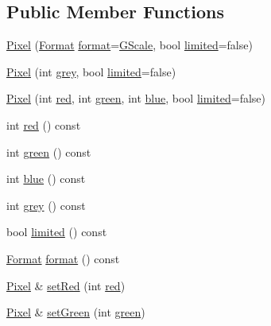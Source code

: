 \subsection*{Public Member Functions}
\begin{DoxyCompactItemize}
\item 
\mbox{\hyperlink{class_pixel_ac82279ce9ebca9dde69f1b0c50adab42}{Pixel}} (\mbox{\hyperlink{class_pixel_aa1531d5d16ab3ab809a8e071145f0a50}{Format}} \mbox{\hyperlink{class_pixel_a83b0f5dce7b7c07c9e482658426eea5f}{format}}=\mbox{\hyperlink{class_pixel_aa1531d5d16ab3ab809a8e071145f0a50a0067e32761943fc277951f656686ce1a}{G\+Scale}}, bool \mbox{\hyperlink{class_pixel_a95cb63613222cda3c462a350540bcbc0}{limited}}=false)
\item 
\mbox{\hyperlink{class_pixel_a3657c5d595b9eb8d2aab7d5cd4f0c200}{Pixel}} (int \mbox{\hyperlink{class_pixel_ae9b03b6a253f0ba344a7bfaa8d4a17f6}{grey}}, bool \mbox{\hyperlink{class_pixel_a95cb63613222cda3c462a350540bcbc0}{limited}}=false)
\item 
\mbox{\hyperlink{class_pixel_ae3cc04f5e89adc67faf1af864338e537}{Pixel}} (int \mbox{\hyperlink{class_pixel_a29d67107325086ef34118afb5dcf440a}{red}}, int \mbox{\hyperlink{class_pixel_a7febfbcec6e4ed1a31e86a78fc493fcf}{green}}, int \mbox{\hyperlink{class_pixel_a2df4c0422c0bfe60e03bbc3496ea6618}{blue}}, bool \mbox{\hyperlink{class_pixel_a95cb63613222cda3c462a350540bcbc0}{limited}}=false)
\item 
int \mbox{\hyperlink{class_pixel_a29d67107325086ef34118afb5dcf440a}{red}} () const
\item 
int \mbox{\hyperlink{class_pixel_a7febfbcec6e4ed1a31e86a78fc493fcf}{green}} () const
\item 
int \mbox{\hyperlink{class_pixel_a2df4c0422c0bfe60e03bbc3496ea6618}{blue}} () const
\item 
int \mbox{\hyperlink{class_pixel_ae9b03b6a253f0ba344a7bfaa8d4a17f6}{grey}} () const
\item 
bool \mbox{\hyperlink{class_pixel_a95cb63613222cda3c462a350540bcbc0}{limited}} () const
\item 
\mbox{\hyperlink{class_pixel_aa1531d5d16ab3ab809a8e071145f0a50}{Format}} \mbox{\hyperlink{class_pixel_a83b0f5dce7b7c07c9e482658426eea5f}{format}} () const
\item 
\mbox{\hyperlink{class_pixel}{Pixel}} \& \mbox{\hyperlink{class_pixel_ae0c6a2b07578ee6b54512629b1822195}{set\+Red}} (int \mbox{\hyperlink{class_pixel_a29d67107325086ef34118afb5dcf440a}{red}})
\item 
\mbox{\hyperlink{class_pixel}{Pixel}} \& \mbox{\hyperlink{class_pixel_a7779ebd5228cd4cde61ebca23b0b4e53}{set\+Green}} (int \mbox{\hyperlink{class_pixel_a7febfbcec6e4ed1a31e86a78fc493fcf}{green}})

\end{DoxyCompactItemize}
